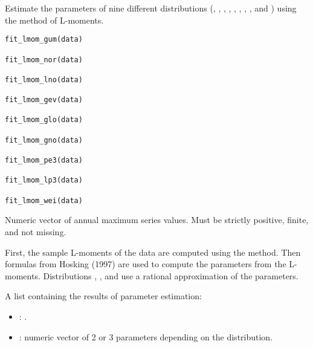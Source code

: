 \documentclass[a4paper]{book}
\begin{document}
%
\begin{Description}
Estimate the parameters of nine different distributions (, ,
, , , , , , and ) using
the method of L-moments.
\end{Description}
%
\begin{Usage}
\begin{verbatim}
fit_lmom_gum(data)

fit_lmom_nor(data)

fit_lmom_lno(data)

fit_lmom_gev(data)

fit_lmom_glo(data)

fit_lmom_gno(data)

fit_lmom_pe3(data)

fit_lmom_lp3(data)

fit_lmom_wei(data)
\end{verbatim}
\end{Usage}
%
\begin{Arguments}
\begin{ldescription}
\item[\code{data}] Numeric vector of annual maximum series values.
Must be strictly positive, finite, and not missing.
\end{ldescription}
\end{Arguments}
%
\begin{Details}
First, the sample L-moments of the data are computed using the 
method. Then formulas from Hosking (1997) are used to compute the parameters from
the L-moments. Distributions , , and  use a rational
approximation of the parameters.
\end{Details}
%
\begin{Value}
A list containing the results of parameter estimation:
\begin{itemize}

\item{} : .
\item{} : numeric vector of 2 or 3 parameters depending on the distribution.

\end{itemize}

\end{Value}
\end{document}
